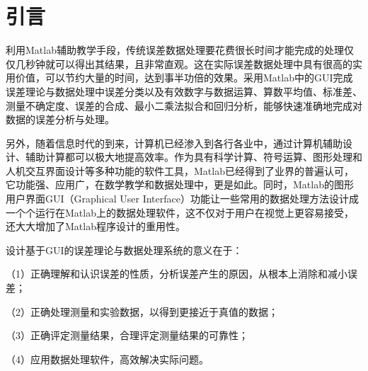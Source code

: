 \part*{引言}
利用Matlab辅助教学手段，传统误差数据处理要花费很长时间才能完成的处理仅仅几秒钟就可以得出其结果，且非常直观。这在实际误差数据处理中具有很高的实用价值，可以节约大量的时间，达到事半功倍的效果。采用Matlab中的GUI完成误差理论与数据处理中误差分类以及有效数字与数据运算、算数平均值、标准差、测量不确定度、误差的合成、最小二乘法拟合和回归分析，能够快速准确地完成对数据的误差分析与处理。

另外，随着信息时代的到来，计算机已经渗入到各行各业中，通过计算机辅助设计、辅助计算都可以极大地提高效率。作为具有科学计算、符号运算、图形处理和人机交互界面设计等多种功能的软件工具，Matlab已经得到了业界的普遍认可，它功能强、应用广，在数学教学和数据处理中，更是如此。同时，Matlab的图形用户界面GUI（Graphical User Interface）功能让一些常用的数据处理方法设计成一个个运行在Matlab上的数据处理软件，这不仅对于用户在视觉上更容易接受，还大大增加了Matlab程序设计的重用性。

设计基于GUI的误差理论与数据处理系统的意义在于：

（1）正确理解和认识误差的性质，分析误差产生的原因，从根本上消除和减小误差；

（2）正确处理测量和实验数据，以得到更接近于真值的数据；

（3）正确评定测量结果，合理评定测量结果的可靠性；

（4）应用数据处理软件，高效解决实际问题。